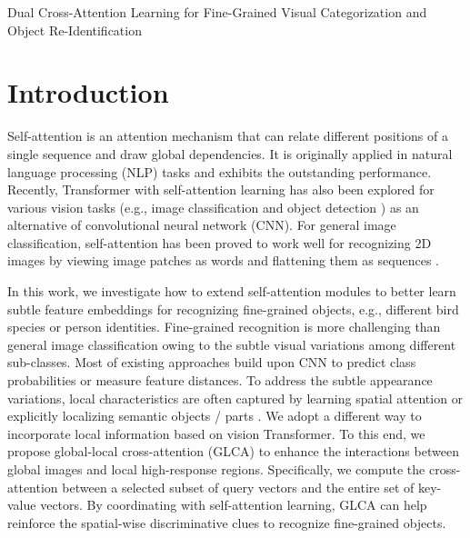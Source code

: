 Dual Cross-Attention Learning for Fine-Grained Visual Categorization and Object Re-Identification

\section{Introduction}

Self-attention is an attention mechanism that can relate different positions of a single sequence and draw global dependencies. It is originally applied in natural language processing (NLP) tasks \cite{vaswani2017attention,devlin2018bert} and exhibits the outstanding performance. Recently, Transformer with self-attention learning has also been explored for various vision tasks (e.g., image classification \cite{dosovitskiy2020image,chen2020generative,touvron2020training,ramachandran2019stand,hu2019lrnet,wang2020axial} and object detection \cite{carion2020detr,zhu2020deformable}) as an alternative of convolutional neural network (CNN). For general image classification, self-attention has been proved to work well for recognizing 2D images by viewing image patches as words and flattening them as sequences \cite{dosovitskiy2020image,touvron2020training}.

In this work, we investigate how to extend self-attention modules to better learn subtle feature embeddings for recognizing fine-grained objects, e.g., different bird species or person identities. Fine-grained recognition is more challenging than general image classification owing to the subtle visual variations among different sub-classes. Most of existing approaches build upon CNN to predict class probabilities or measure feature distances. To address the subtle appearance variations, local characteristics are often captured by learning spatial attention \cite{fu2017look,zheng2017learning,sun2018multi,luo2019cross} or explicitly localizing semantic objects / parts \cite{zheng2019looking,ding2019selective,yang2018learning, zhang2019learning}.
We adopt a different way to incorporate local information based on vision Transformer. To this end, we propose global-local cross-attention (GLCA) to enhance the interactions between global images and local high-response regions. Specifically, we compute the cross-attention between a selected subset of query vectors and the entire set of key-value vectors. By coordinating with self-attention learning, GLCA can help reinforce the spatial-wise discriminative clues to recognize fine-grained objects.

